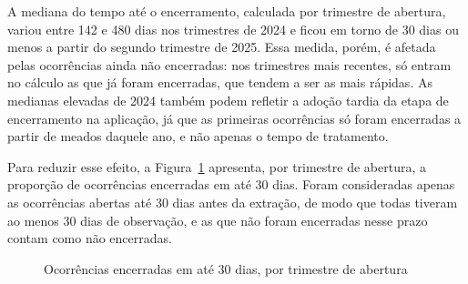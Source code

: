 A mediana do tempo até o encerramento, calculada por trimestre de abertura, variou entre 142 e 480 dias nos trimestres de 2024 e ficou em torno de 30 dias ou menos a partir do segundo trimestre de 2025. Essa medida, porém, é afetada pelas ocorrências ainda não encerradas: nos trimestres mais recentes, só entram no cálculo as que já foram encerradas, que tendem a ser as mais rápidas. As medianas elevadas de 2024 também podem refletir a adoção tardia da etapa de encerramento na aplicação, já que as primeiras ocorrências só foram encerradas a partir de meados daquele ano, e não apenas o tempo de tratamento.

Para reduzir esse efeito, a Figura~\ref{fig:encerradas-30} apresenta, por trimestre de abertura, a proporção de ocorrências encerradas em até 30 dias. Foram consideradas apenas as ocorrências abertas até 30 dias antes da extração, de modo que todas tiveram ao menos 30 dias de observação, e as que não foram encerradas nesse prazo contam como não encerradas.

\begin{figure}[htb]
    \centering
    \caption{Ocorrências encerradas em até 30 dias, por trimestre de abertura}
    \label{fig:encerradas-30}
\end{figure}

